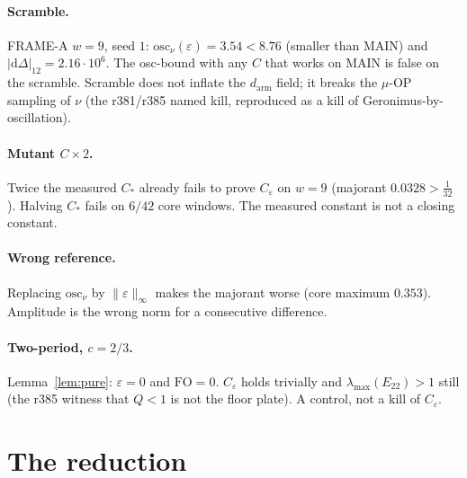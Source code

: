 \documentclass[11pt]{article}
\theoremstyle{remark}
\begin{document}
\paragraph{Scramble.}
FRAME-A $w=9$, seed $1$: $\mathrm{osc}_\nu(\varepsilon)=3.54<8.76$
(smaller than MAIN) and $\lvert\mathrm{d}\Delta\rvert_{12}=2.16\cdot10^6$.
The osc-bound with any $C$ that works on MAIN is false on the scramble.
Scramble does not inflate the $d_{\mathrm{arm}}$ field; it breaks the
$\mu$-OP sampling of $\nu$ (the r381/r385 named kill, reproduced as a
kill of Geronimus-by-oscillation).

\paragraph{Mutant $C\times 2$.}
Twice the measured $C_*$ already fails to prove $C_\varepsilon$ on $w=9$
(majorant $0.0328>\tfrac1{32}$).  Halving $C_*$ fails on $6/42$ core
windows.  The measured constant is not a closing constant.

\paragraph{Wrong reference.}
Replacing $\mathrm{osc}_\nu$ by $\lVert\varepsilon\rVert_\infty$ makes
the majorant worse (core maximum $0.353$).  Amplitude is the wrong
norm for a consecutive difference.

\paragraph{Two-period, $c=2/3$.}
Lemma~\ref{lem:pure}: $\varepsilon=0$ and $\mathrm{FO}=0$.
$C_\varepsilon$ holds trivially and $\lambda_{\max}(E_{22})>1$ still
(the r385 witness that $Q<1$ is not the floor plate).
A control, not a kill of $C_\varepsilon$.

\section{The reduction}\label{sec:red}
\end{document}
